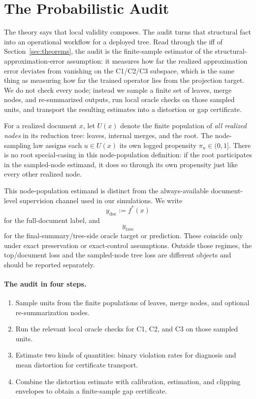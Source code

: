\section{The Probabilistic Audit}\label{sec:estimation}

The theory says that local validity composes. The audit turns that structural fact into an operational workflow for a deployed tree. Read through the iff of Section~\ref{sec:theorems}, the audit is the finite-sample estimator of the structural-approximation-error assumption: it measures how far the realized approximation error deviates from vanishing on the C1/C2/C3 subspace, which is the same thing as measuring how far the trained operator lies from the projection target. We do not check every node; instead we sample a finite set of leaves, merge nodes, and re-summarized outputs, run local oracle checks on those sampled units, and transport the resulting estimates into a distortion or gap certificate.

For a realized document $x$, let $U(x)$ denote the finite population of \emph{all realized nodes} in its reduction tree: leaves, internal merges, and the root. The node-sampling law assigns each $u \in U(x)$ its own logged propensity $\pi_u \in (0,1]$. There is no root special-casing in this node-population definition: if the root participates in the sampled-node estimand, it does so through its own propensity just like every other realized node.

This node-population estimand is distinct from the always-available document-level supervision channel used in our simulations. We write
\[
y_{\mathrm{doc}} := f^\ast(x)
\]
for the full-document label, and
\[
y_{\mathrm{tree}}
\]
for the final-summary/tree-side oracle target or prediction. These coincide only under exact preservation or exact-control assumptions. Outside those regimes, the top/document loss and the sampled-node tree loss are different objects and should be reported separately.

\paragraph{The audit in four steps.}
\begin{enumerate}[leftmargin=1.5em]
    \item Sample units from the finite populations of leaves, merge nodes, and optional re-summarization nodes.
    \item Run the relevant local oracle checks for C1, C2, and C3 on those sampled units.
    \item Estimate two kinds of quantities: binary violation rates for diagnosis and mean distortion for certificate transport.
    \item Combine the distortion estimate with calibration, estimation, and clipping envelopes to obtain a finite-sample gap certificate.
\end{enumerate}

